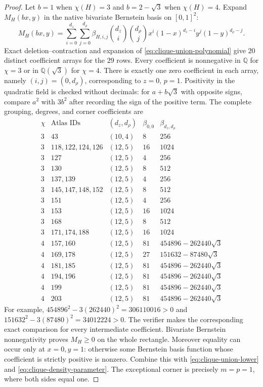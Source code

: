 \documentclass[11pt]{article}
\begin{document}
\begin{proof}
Let $b=1$ when $\chi(H)=3$ and $b=2-\sqrt3$ when $\chi(H)=4$.  Expand
$M_H(bx,y)$ in the native bivariate Bernstein basis on $[0,1]^2$:
\begin{equation}
 M_H(bx,y)=
 \sum_{i=0}^{d_z}\sum_{j=0}^{d_\rho}
 \beta_{H,i,j}\binom{d_z}{i}\binom{d_\rho}{j}
 x^i(1-x)^{d_z-i}y^j(1-y)^{d_\rho-j}.
 \label{eq:clique-union-bernstein}
\end{equation}
Exact deletion--contraction and expansion of
\eqref{eq:clique-union-polynomial} give $20$ distinct coefficient arrays for
the $29$ rows.  Every coefficient is nonnegative in $\mathbb Q$ for
$\chi=3$ or in $\mathbb Q(\sqrt3)$ for $\chi=4$.  There is exactly one zero
coefficient in each array, namely $(i,j)=(0,d_\rho)$, corresponding to
$z=0$, $p=1$.  Positivity in the quadratic field is checked without
decimals: for $a+b\sqrt3$ with opposite signs, compare $a^2$ with $3b^2$
after recording the sign of the positive term.  The complete grouping,
degrees, and corner coefficients are
\[
\begin{array}{c|l|c|c|c}
\chi&\text{Atlas IDs}&(d_z,d_\rho)&\beta_{0,0}&\beta_{d_z,d_\rho}\\ \hline
3&43&(10,4)&8&256\\
3&118,122,124,126&(12,5)&16&1024\\
3&127&(12,5)&4&256\\
3&130&(12,5)&8&512\\
3&137,139&(12,5)&4&256\\
3&145,147,148,152&(12,5)&8&512\\
3&151&(12,5)&4&256\\
3&153&(12,5)&16&1024\\
3&168&(12,5)&8&512\\
3&171,174,188&(12,5)&16&1024\\ \hline
4&157,160&(12,5)&81&454896-262440\sqrt3\\
4&169,178&(12,5)&27&151632-87480\sqrt3\\
4&181,185&(12,5)&81&454896-262440\sqrt3\\
4&194,196&(12,5)&81&454896-262440\sqrt3\\
4&199&(12,5)&81&454896-262440\sqrt3\\
4&203&(12,5)&81&454896-262440\sqrt3
\end{array}
\]
For example,
$454896^2-3(262440)^2=306110016>0$ and
$151632^2-3(87480)^2=34012224>0$.  The verifier makes the corresponding
exact comparison for every intermediate coefficient.  Bivariate Bernstein
nonnegativity proves $M_H\geq0$ on the whole rectangle.  Moreover equality
can occur only at $x=0,y=1$: otherwise some Bernstein basis function whose
coefficient is strictly positive is nonzero.  Combine
this with \eqref{eq:clique-union-lower} and
\eqref{eq:clique-density-parameter}.  The exceptional corner is precisely
$m=p=1$, where both sides equal one.
\end{proof}
\end{document}
